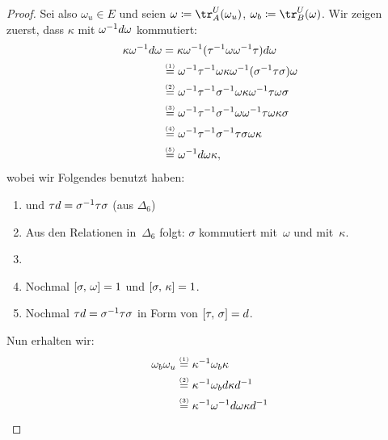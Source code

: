 \begin{proof}
    Sei also $\omega_u\in E$ und seien $\omega\defeq\tr^U_A(\omega_u)$,
    $\omega_b\defeq\tr^U_B(\omega)$. Wir zeigen zuerst, dass
    $\kappa$ mit $\omega^{-1} d\omega$ kommutiert:
    \begin{align*}
        \kappa\omega^{-1} d\omega
        &=
        \kappa\omega^{-1} (\tau^{-1}\omega\omega^{-1}\tau) d\omega
        \\
        &\overset{\scriptscriptstyle(1)}=
        \omega^{-1}\tau^{-1}\omega\kappa \omega^{-1}
            (\sigma^{-1}\tau\sigma)\omega
        \\
        &\overset{\scriptscriptstyle(2)}=
        \omega^{-1}\tau^{-1}\sigma^{-1}
            \omega\kappa \omega^{-1}\tau\omega\sigma
        \\
        &\overset{\scriptscriptstyle(3)}=
        \omega^{-1}\tau^{-1}\sigma^{-1}
            \omega\omega^{-1}\tau\omega\kappa\sigma
        \\
        &\overset{\scriptscriptstyle(4)}=
        \omega^{-1}\tau^{-1}\sigma^{-1}\tau\sigma\omega\kappa
        \\
        &\overset{\scriptscriptstyle(5)}=
        \omega^{-1} d\omega\kappa
    , \end{align*}
    wobei wir Folgendes benutzt haben:
    \begin{enumerate}[(1), itemsep=0pt, topsep=0.5\baselineskip]
        \item
             und $\tau d =
            \sigma^{-1}\tau\sigma$ (aus $\Delta_6$)
        \item
            Aus den Relationen in~$\Delta_6$ folgt: $\sigma$ kommutiert
            mit~$\omega$ und mit~$\kappa$.
        \item
        \item
            Nochmal $\cu[\sigma, \omega] = 1$
            und $\cu[\sigma, \kappa] = 1$.
        \item
            Nochmal $\tau d = \sigma^{-1}\tau\sigma$ in Form von
            $\cu[\tau, \sigma] = d$.
    \end{enumerate}
    Nun erhalten wir:
    \begin{align*}
        \omega_b\omega_u
        &\overset{\scriptscriptstyle(1)}=
        \kappa\inv\omega_b\kappa
        \\
        &\overset{\scriptscriptstyle(2)}=
        \kappa\inv\omega_b d\kappa d\inv
        \\
        &\overset{\scriptscriptstyle(3)}=
        \kappa\inv \omega\inv d\omega \kappa d\inv

\end{align*}
\end{proof}
